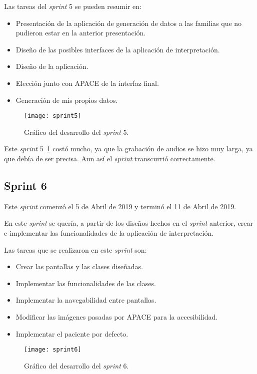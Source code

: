 Las tareas del \textit{sprint} 5 se pueden resumir en:
\begin{itemize}
	\item Presentación de la aplicación de generación de datos a las familias que no pudieron estar en la anterior presentación.
	\item Diseño de las posibles interfaces de la aplicación de interpretación.
	\item Diseño de la aplicación.
	\item Elección junto con APACE de la interfaz final.
	\item Generación de mis propios datos.
\end{itemize}

\begin{figure}
	\centering
	\texttt{[image: sprint5]}
	\caption{Gráfico del desarrollo del \textit{sprint} 5.}
	\label{fig:sprint5}
\end{figure}

Este \textit{sprint} 5~\ref{fig:sprint5} costó mucho, ya que la grabación de audios se hizo muy larga, ya que debía de ser precisa. Aun así el \textit{sprint} transcurrió correctamente.

\subsection{Sprint 6}
Este \textit{sprint} comenzó el 5 de Abril de 2019 y terminó el 11 de Abril de 2019.

En este \textit{sprint} se quería, a partir de los diseños hechos en el \textit{sprint} anterior, crear e implementar las funcionalidades de la aplicación de interpretación.

Las tareas que se realizaron en este \textit{sprint} son:
\begin{itemize}
	\item Crear las pantallas y las clases diseñadas.
	\item Implementar las funcionalidades de las clases.
	\item Implementar la navegabilidad entre pantallas.
	\item Modificar las imágenes pasadas por APACE para la accesibilidad.
	\item Implementar el paciente por defecto.
\end{itemize}

\begin{figure}
	\centering
	\texttt{[image: sprint6]}
	\caption{Gráfico del desarrollo del \textit{sprint} 6.}
	\label{fig:sprint6}
\end{figure}

